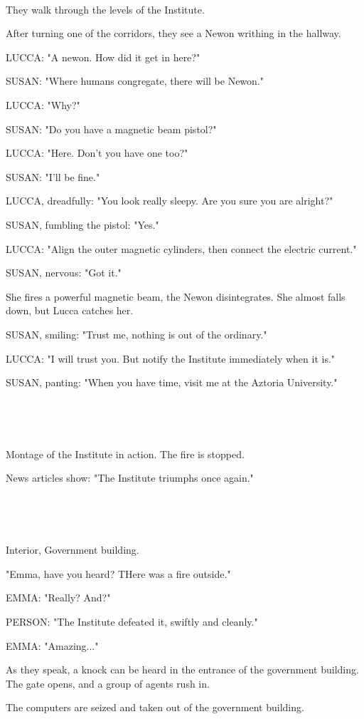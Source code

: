 \documentclass[11pt]{article}
\begin{document}
\ 

They walk through the levels of the Institute. 

After turning one of the corridors, they see a Newon writhing in the hallway.

LUCCA: "A newon. How did it get in here?"

SUSAN: "Where humans congregate, there will be Newon."

LUCCA: "Why?"

SUSAN: "Do you have a magnetic beam pistol?"

LUCCA: "Here. 
Don't you have one too?"

SUSAN: "I'll be fine."

LUCCA, dreadfully: "You look really sleepy.
Are you sure you are alright?"

SUSAN, fumbling the pistol: "Yes."

LUCCA: "Align the outer magnetic cylinders, then connect the electric current."

SUSAN, nervous: "Got it."

She fires a powerful magnetic beam, the Newon disintegrates.
She almost falls down, but Lucca catches her.

SUSAN, smiling: "Trust me, nothing is out of the ordinary."

LUCCA: "I will trust you.
But notify the Institute immediately when it is."

SUSAN, panting: "When you have time, visit me at the Aztoria University."

\ 

\ 

Montage of the Institute in action.
The fire is stopped.

News articles show: "The Institute triumphs once again."

\ 

\ 

Interior, Government building.

"Emma, have you heard? THere was a fire outside."

EMMA: "Really? And?"

PERSON: "The Institute defeated it, swiftly and cleanly."

EMMA: "Amazing..."

As they speak, a knock can be heard in the entrance of the government building.
The gate opens, and a group of agents rush in.

The computers are seized and taken out of the government building.
\end{document}
